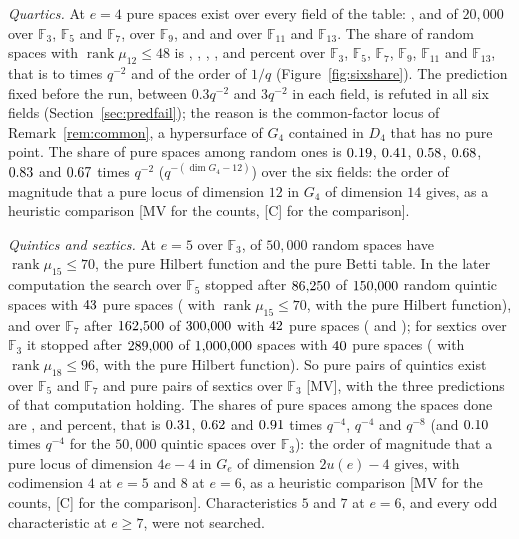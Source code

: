 \documentclass[11pt]{article}
\theoremstyle{definition}
\theoremstyle{remark}
\newcommand{\F}{\mathbb{F}}
\begin{document}
\emph{Quartics.} At $e=4$ pure spaces exist over every field of the table: \nsixBOneThreePure{}, \nsixBOneFivePure{} and \nsixBOneSevenPure{} of $20{,}000$ over $\F_3$, $\F_5$ and $\F_7$, \nsixBThreeNinePure{} over $\F_9$, and \nsixBTwoElevenPure{} and \nsixBTwoThirteenPure{} over $\F_{11}$ and $\F_{13}$. The share of random spaces with $\operatorname{rank}\mu_{12}\le48$ is \nsixBOneThreeShareRank{}, \nsixBOneFiveShareRank{}, \nsixBOneSevenShareRank{}, \nsixBThreeNineShareRank{}, \nsixBTwoElevenShareRank{} and \nsixBTwoThirteenShareRank{} percent over $\F_3$, $\F_5$, $\F_7$, $\F_9$, $\F_{11}$ and $\F_{13}$, that is \nsixRatioMin{} to \nsixRatioMax{} times $q^{-2}$ and of the order of $1/q$ (Figure~\ref{fig:sixshare}). The prediction fixed before the run, between $0.3q^{-2}$ and $3q^{-2}$ in each field, is refuted in all six fields (Section~\ref{sec:predfail}); the reason is the common-factor locus of Remark~\ref{rem:common}, a hypersurface of $G_4$ contained in $D_4$ that has no pure point. The share of pure spaces among random ones is $0.19$, $0.41$, $0.58$, $0.68$, $0.83$ and $0.67$ times $q^{-2}$ ($q^{-(\dim G_4-12)}$) over the six fields: the order of magnitude that a pure locus of dimension $12$ in $G_4$ of dimension $14$ gives, as a heuristic comparison [MV for the counts, [C] for the comparison].

\emph{Quintics and sextics.} At $e=5$ over $\F_3$, \nsixCThreeRank{} of $50{,}000$ random spaces have $\operatorname{rank}\mu_{15}\le70$, \nsixCThreePureHF{} the pure Hilbert function and \nsixCThreePure{} the pure Betti table. In the later computation the search over $\F_5$ stopped after $86{,}250$ of $150{,}000$ random quintic spaces with $43$ pure spaces (\neightAFiveRank{} with $\operatorname{rank}\mu_{15}\le70$, \neightAFivePureHF{} with the pure Hilbert function), and over $\F_7$ after $162{,}500$ of $300{,}000$ with $42$ pure spaces (\neightBSevenRank{} and \neightBSevenPureHF{}); for sextics over $\F_3$ it stopped after $289{,}000$ of $1{,}000{,}000$ spaces with $40$ pure spaces (\neightCThreeRank{} with $\operatorname{rank}\mu_{18}\le96$, \neightCThreePureHF{} with the pure Hilbert function). So pure pairs of quintics exist over $\F_5$ and $\F_7$ and pure pairs of sextics over $\F_3$ [MV], with the three predictions of that computation holding. The shares of pure spaces among the spaces done are \neightAFiveSharePure{}, \neightBSevenSharePure{} and \neightCThreeSharePure{} percent, that is $0.31$, $0.62$ and $0.91$ times $q^{-4}$, $q^{-4}$ and $q^{-8}$ (and $0.10$ times $q^{-4}$ for the $50{,}000$ quintic spaces over $\F_3$): the order of magnitude that a pure locus of dimension $4e-4$ in $G_e$ of dimension $2u(e)-4$ gives, with codimension $4$ at $e=5$ and $8$ at $e=6$, as a heuristic comparison [MV for the counts, [C] for the comparison]. Characteristics $5$ and $7$ at $e=6$, and every odd characteristic at $e\ge7$, were not searched.
\end{document}
